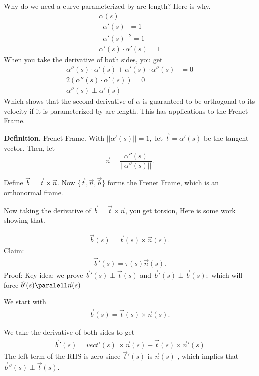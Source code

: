 \documentclass{article}
\begin{document}
Why do we need a curve parameterized by arc length? Here is why. 
\begin{align*}
    \alpha(s) \tag{parameterized by arc length}\\
    ||\alpha'(s)|| = 1 \\
    ||\alpha'(s)||^2 = 1 \\
    \alpha'(s) \cdot \alpha'(s) = 1
\end{align*}
When you take the derivative of both sides, you get 
\begin{align*}
     \alpha''(s) \cdot \alpha'(s) +  \alpha'(s) \cdot \alpha''(s) &= 0 \\
     2(\alpha''(s) \cdot \alpha'(s)) = 0 \\
     \alpha''(s) \perp \alpha'(s)
\end{align*}
Which shows that the second derivative of $\alpha$ is guaranteed to be orthogonal to its velocity if it is parameterized by arc length. This has applications to the Frenet Frame.

\textbf{Definition.} Frenet Frame. With $||\alpha'(s)|| = 1,$ let $\vec{t} =\alpha'(s)$ be the tangent vector. Then, let 
\[
\vec{n} = \frac{\alpha''(s)}{||\alpha''(s)||}.
\]

Define $\vec{b} = \vec{t} \times \vec{n}$.  Now $\{\vec{t}, \vec{n}, \vec{b}\}$ forms the Frenet Frame, which is an orthonormal frame.

Now taking the derivative of $\vec{b} = \vec{t} \times \vec{n}$, you get torsion,
Here is some work showing that.

\begin{align*}
    \vec{b}(s) = \vec{t}(s) \times \vec{n}(s).
\end{align*}
Claim: 
\begin{align*}
    \vec{b}'(s) = \tau(s) \vec{n}(s).
\end{align*}
Proof:
Key idea: we prove $\vec{b}'(s) \perp \vec{t}(s)$ and $\vec{b}'(s) \perp \vec{b}(s);$ which will force $\vec{b}'(s) \paralell \vec{n}(s)$

We start with 
\begin{align*}
    \vec{b}(s) = \vec{t}(s) \times \vec{n}(s).
\end{align*}

We take the derivative of both sides to get 
\begin{align*}
    \vec{b}'(s) = vec{t}'(s)\ \times \vec{n}(s) + \vec{t}(s) \times \vec{n}'(s)
\end{align*}
The left term of the RHS is zero since $\vec{t}'(s)$ is $\vec{n}(s)$ , which implies that $\vec{b}''(s) \perp \vec{t}(s)$.
\end{document}
